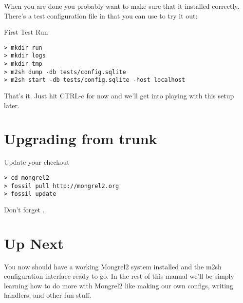 When you are done you probably want to make sure that it installed correctly.
There's a test configuration file in  that you can 
use to try it out:

\begin{code}{First Test Run}
\begin{Verbatim}
> mkdir run
> mkdir logs
> mkdir tmp
> m2sh dump -db tests/config.sqlite
> m2sh start -db tests/config.sqlite -host localhost
\end{Verbatim}
\end{code}

That's it.  Just hit CTRL-c for now and we'll get into playing with this
setup later.

\section{Upgrading from trunk}
\begin{code}{Update your checkout}
\begin{Verbatim}
> cd mongrel2
> fossil pull http://mongrel2.org
> fossil update
\end{Verbatim}
\end{code}

Don't forget .


\section{Up Next}

You now should have a working Mongrel2 system installed and the m2sh configuration
interface ready to go.  In the rest of this manual we'll be simply learning how
to do more with Mongrel2 like making our own configs, writing handlers, and other
fun stuff.

